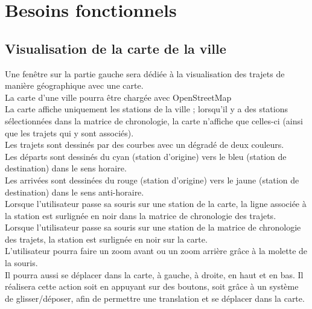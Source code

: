 \documentclass[12pt]{article}
\begin{document}
	\section{Besoins fonctionnels}
		\subsection{Visualisation de la carte de la ville}
		Une fenêtre sur la partie gauche sera dédiée à la visualisation des trajets de
		manière géographique avec une carte.\\
		La carte d’une ville pourra être chargée avec OpenStreetMap\\
		La carte affiche uniquement les stations de la ville ; lorsqu’il y a des stations
		sélectionnées dans la matrice de chronologie, la carte n’affiche que celles-ci (ainsi
		que les trajets qui y sont associés).\\
		Les trajets sont dessinés par des courbes avec un dégradé de deux couleurs.\\
		Les départs sont dessinés du cyan (station d’origine) vers le bleu (station de
		destination) dans le sens horaire.\\
		Les arrivées sont dessinées du rouge (station d’origine) vers le jaune
		(station de destination) dans le sens anti-horaire.\\
		Lorsque l’utilisateur passe sa souris sur une station de la carte, la ligne associée
		à la station est surlignée en noir dans la matrice de chronologie des trajets.\\
		Lorsque l’utilisateur passe sa souris sur une station de la matrice de chronologie
		des trajets, la station est surlignée en noir sur la carte.\\
		L’utilisateur pourra faire un zoom avant ou un zoom arrière grâce à la molette de la
		souris.\\
		Il pourra aussi se déplacer dans la carte, à gauche, à droite, en haut et en bas. Il
		réalisera cette action soit en appuyant sur des boutons, soit grâce à un système
		de glisser/déposer, afin de permettre une translation et se déplacer dans la carte.\\
		
\end{document}
